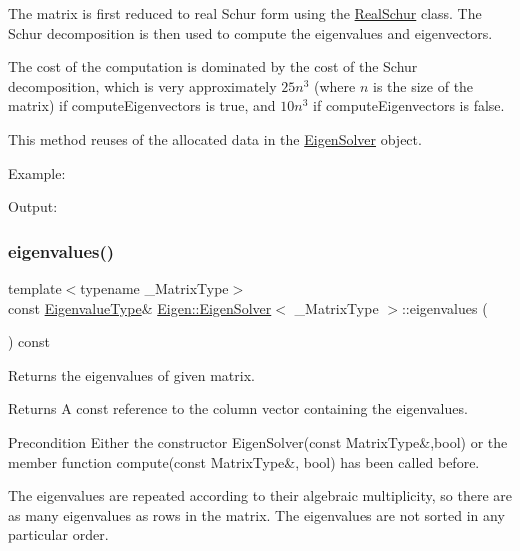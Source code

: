 The matrix is first reduced to real Schur form using the \mbox{\hyperlink{class_eigen_1_1_real_schur}{Real\+Schur}} class. The Schur decomposition is then used to compute the eigenvalues and eigenvectors.

The cost of the computation is dominated by the cost of the Schur decomposition, which is very approximately $ 25n^3 $ (where $ n $ is the size of the matrix) if {\ttfamily compute\+Eigenvectors} is true, and $ 10n^3 $ if {\ttfamily compute\+Eigenvectors} is false.

This method reuses of the allocated data in the \mbox{\hyperlink{class_eigen_1_1_eigen_solver}{Eigen\+Solver}} object.

Example\+: 
\begin{DoxyCodeInclude}{0}
\end{DoxyCodeInclude}
 Output\+: 
\begin{DoxyVerbInclude}
\end{DoxyVerbInclude}
 \mbox{\label{class_eigen_1_1_eigen_solver_a114189009e42f5e03372a7a3dfa33b97}} 
\subsubsection{\texorpdfstring{eigenvalues()}{eigenvalues()}}
{\footnotesize\ttfamily template$<$typename \+\_\+\+Matrix\+Type$>$ \\
const \mbox{\hyperlink{class_eigen_1_1_eigen_solver_adc446bcb60572758fa64515f2825db62}{Eigenvalue\+Type}}\& \mbox{\hyperlink{class_eigen_1_1_eigen_solver}{Eigen\+::\+Eigen\+Solver}}$<$ \+\_\+\+Matrix\+Type $>$\+::eigenvalues (\begin{DoxyParamCaption}{ }\end{DoxyParamCaption}) const\hspace{0.3cm}{\ttfamily [inline]}}



Returns the eigenvalues of given matrix. 

\begin{DoxyReturn}{Returns}
A const reference to the column vector containing the eigenvalues.
\end{DoxyReturn}
\begin{DoxyPrecond}{Precondition}
Either the constructor Eigen\+Solver(const Matrix\+Type\&,bool) or the member function compute(const Matrix\+Type\&, bool) has been called before.
\end{DoxyPrecond}
The eigenvalues are repeated according to their algebraic multiplicity, so there are as many eigenvalues as rows in the matrix. The eigenvalues are not sorted in any particular order.

